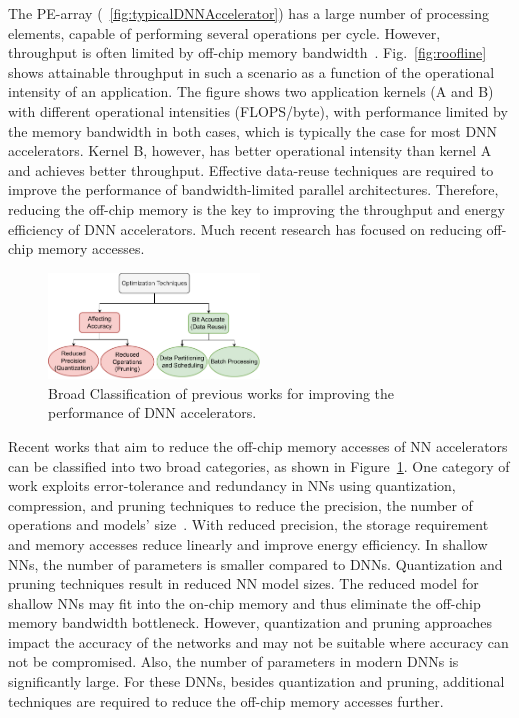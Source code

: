 \documentclass[a4paper,10pt]{article}
\begin{document}
The PE-array (\figurename{~\ref{fig:typicalDNNAccelerator}}) has a large number of processing elements, capable of performing several operations per cycle. However, throughput is often limited by off-chip memory bandwidth~\cite{williams2009roofline}. Fig.~\ref{fig:roofline} shows attainable throughput in such a scenario as a function of the operational intensity of an application. The figure shows two application kernels (A and B) with different operational intensities (FLOPS/byte), with performance limited by the memory bandwidth in both cases, which is typically the case for most DNN accelerators. Kernel B, however, has better operational intensity than kernel A and achieves better throughput. Effective data-reuse techniques are required to improve the performance of bandwidth-limited parallel architectures. Therefore, reducing the off-chip memory is the key to improving the throughput and energy efficiency of DNN accelerators. Much recent research has focused on reducing off-chip memory accesses.
\begin{figure}[!htb]
	\centering
    \captionsetup{font=sf}
	\includegraphics[width=0.5\textwidth]{previousWorkClassification}
	\caption{Broad Classification of previous works for improving the performance of DNN accelerators.}
	\label{fig:previousWorkClassification}
\end{figure}

Recent works that aim to reduce the off-chip memory accesses of NN accelerators can be classified into two broad categories, as shown in Figure~\ref{fig:previousWorkClassification}. One category of work exploits error-tolerance and redundancy in NNs using quantization, compression, and pruning techniques to reduce the precision, the number of operations and models' size~\cite{ferreira2016fpga,wang2018c,chang2015recurrent,han2017ese,lee2016fpga}. With reduced precision, the storage requirement and memory accesses reduce linearly and improve energy efficiency. In shallow NNs, the number of parameters is smaller compared to DNNs. Quantization and pruning techniques result in reduced NN model sizes. The reduced model for shallow NNs may fit into the on-chip memory and thus eliminate the off-chip memory bandwidth bottleneck. However, quantization and pruning approaches impact the accuracy of the networks and may not be suitable where accuracy can not be compromised. Also, the number of parameters in modern DNNs is significantly large. For these DNNs, besides quantization and pruning, additional techniques are required to reduce the off-chip memory accesses further.
\end{document}
